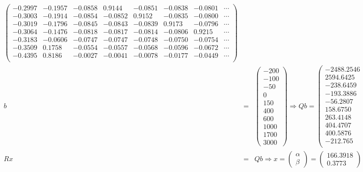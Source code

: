 \documentclass[11pt]{article} %
\begin{document}
\begin{enumerate}[a)]
\begin{eqnarray*}
\begin{pmatrix}
   -0.2997 &   -0.1957 &   -0.0858 &    0.9144 &   -0.0851 &   -0.0838 &   -0.0801 &\cdots \\
   -0.3003 &   -0.1914 &   -0.0854 &   -0.0852 &    0.9152 &   -0.0835 &   -0.0800 &\cdots \\
   -0.3019 &   -0.1796 &   -0.0845 &   -0.0843 &   -0.0839 &    0.9173 &   -0.0796 &\cdots \\
   -0.3064 &   -0.1476 &   -0.0818 &   -0.0817 &   -0.0814 &   -0.0806 &    0.9215 &\cdots \\
   -0.3183 &   -0.0606 &   -0.0747 &   -0.0747 &   -0.0748 &   -0.0750 &   -0.0754 &\cdots \\
   -0.3509 &    0.1758 &   -0.0554 &   -0.0557 &   -0.0568 &   -0.0596 &   -0.0672 &\cdots \\
   -0.4395 &    0.8186 &   -0.0027 &   -0.0041 &   -0.0078 &   -0.0177 &   -0.0449 &\cdots \\
\end{pmatrix} \\
b &=& \begin{pmatrix} -200 \\ -100 \\ -50 \\ 0 \\ 150 \\ 400 \\ 600 \\ 1000 \\ 1700 \\3000 \end{pmatrix}
 \Rightarrow Qb = \begin{pmatrix}
-2488.2546\\
2594.6425\\
-238.6459\\
-193.3886\\
-56.2807\\
158.6750\\
263.4148\\
404.4707\\
400.5876\\
-212.765 \\
\end{pmatrix} \\
Rx &=& Qb \Rightarrow x = \begin{pmatrix} \alpha \\ \beta \end{pmatrix} = \begin{pmatrix} 166.3918 \\ 0.3773\end{pmatrix}
\end{eqnarray*}


\end{enumerate}
\end{document}
